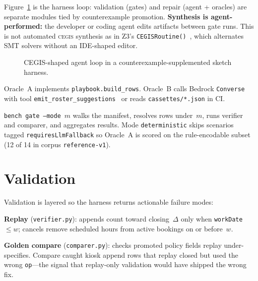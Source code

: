 \documentclass[11pt]{article}
\begin{document}
Figure~\ref{fig:cegis} is the harness loop: validation (gates) and repair (agent + oracles)
are separate modules tied by counterexample promotion. \textbf{Synthesis is agent-performed:}
the developer or coding agent edits artifacts between gate runs. This is not automated
\textsc{cegis} synthesis as in Z3's \texttt{CEGISRoutine()}~\cite{marcelwa2016cegis}, which
alternates SMT solvers without an IDE-shaped editor.

\begin{figure}[h]
\centering
{}
\caption{CEGIS-shaped agent loop in a counterexample-supplemented sketch harness.}
\label{fig:cegis}
\end{figure}

Oracle~A implements \texttt{playbook.build\_rows}. Oracle~B calls Bedrock
\texttt{Converse} with tool \texttt{emit\_roster\_suggestions}~\cite{awsbedrockconverse2024}
or reads \texttt{cassettes/*.json} in CI.

\texttt{bench gate --mode $m$} walks the manifest, resolves rows under~$m$, runs verifier
and comparer, and aggregates results. Mode \texttt{deterministic} skips scenarios tagged
\texttt{requiresLlmFallback} so Oracle~A is scored on the rule-encodable subset (12 of
14 in corpus \texttt{reference-v1}).

\section{Validation}
\label{sec:validation}

Validation is layered so the harness returns actionable failure modes:

\textbf{Replay} (\texttt{verifier.py}): appends count toward closing~$\Delta$ only when
\texttt{workDate} $\le w$; cancels remove scheduled hours from active bookings on or before~$w$.

\textbf{Golden compare} (\texttt{comparer.py}): checks promoted policy fields replay
under-specifies. Compare caught kiosk append rows that replay closed but used the wrong
\texttt{op}---the signal that replay-only validation would have shipped the wrong fix.
\end{document}
